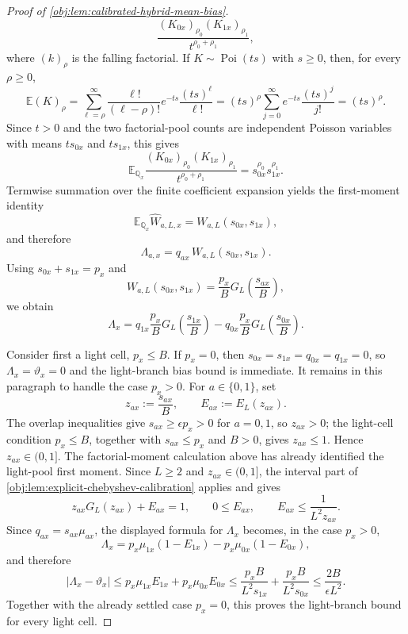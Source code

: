 \documentclass[11pt]{article}
\begin{document}
\begin{proof}[Proof of \cref{obj:lem:calibrated-hybrid-mean-bias}]
\[\frac{(K_{0x})_{\rho_0}(K_{1x})_{\rho_1}}
     {t^{\rho_0+\rho_1}},
\]
where \((k)_\rho\) is the falling factorial.  If \(K\sim\operatorname{Poi}(ts)\) with \(s\ge0\), then, for every \(\rho\ge0\),
\[
\mathbb E (K)_\rho
=
\sum_{\ell=\rho}^\infty
\frac{\ell!}{(\ell-\rho)!}
 e^{-ts}\frac{(ts)^\ell}{\ell!}
=(ts)^\rho
\sum_{j=0}^\infty e^{-ts}\frac{(ts)^j}{j!}
=(ts)^\rho.
\]
Since \(t>0\) and the two factorial-pool counts are independent Poisson variables with means \(t s_{0x}\) and \(t s_{1x}\), this gives
\[
\mathbb E_{\mathbb Q_x}
\frac{(K_{0x})_{\rho_0}(K_{1x})_{\rho_1}}
     {t^{\rho_0+\rho_1}}
=s_{0x}^{\rho_0}s_{1x}^{\rho_1}.
\]
Termwise summation over the finite coefficient expansion yields the first-moment identity
\[
\mathbb E_{\mathbb Q_x}\widehat W_{a,L,x}=W_{a,L}(s_{0x},s_{1x}),
\]
and therefore
\[
\Lambda_{a,x}
=q_{ax}\,W_{a,L}(s_{0x},s_{1x}).
\]
Using \(s_{0x}+s_{1x}=p_x\) and
\[
W_{a,L}(s_{0x},s_{1x})
=
\frac{p_x}{B}G_L\!\left(\frac{s_{ax}}B\right),
\]
we obtain
\[
\Lambda_x
=
q_{1x}\frac{p_x}{B}G_L\!\left(\frac{s_{1x}}B\right)
-
q_{0x}\frac{p_x}{B}G_L\!\left(\frac{s_{0x}}B\right).
\]

Consider first a light cell, \(p_x\le B\).  If \(p_x=0\), then \(s_{0x}=s_{1x}=q_{0x}=q_{1x}=0\), so \(\Lambda_x=\vartheta_x=0\) and the light-branch bias bound is immediate.  It remains in this paragraph to handle the case \(p_x>0\).  For \(a\in\{0,1\}\), set
\[
z_{ax}:=\frac{s_{ax}}B,
\qquad
E_{ax}:=E_L(z_{ax}).
\]
The overlap inequalities give \(s_{ax}\ge\epsilon p_x>0\) for \(a=0,1\), so \(z_{ax}>0\); the light-cell condition \(p_x\le B\), together with \(s_{ax}\le p_x\) and \(B>0\), gives \(z_{ax}\le1\).  Hence \(z_{ax}\in(0,1]\).  The factorial-moment calculation above has already identified the light-pool first moment.  Since \(L\ge2\) and \(z_{ax}\in(0,1]\), the interval part of \cref{obj:lem:explicit-chebyshev-calibration} applies and gives
\[
z_{ax}G_L(z_{ax})+E_{ax}=1,
\qquad
0\le E_{ax},
\qquad
E_{ax}\le\frac{1}{L^2z_{ax}} .
\]  Since
\(q_{ax}=s_{ax}\mu_{ax}\), the displayed formula for \(\Lambda_x\) becomes, in the case \(p_x>0\),
\[
\Lambda_x
=
p_x\mu_{1x}(1-E_{1x})
-
p_x\mu_{0x}(1-E_{0x}),
\]
and therefore
\[
|\Lambda_x-\vartheta_x|
\le
p_x\mu_{1x}E_{1x}+p_x\mu_{0x}E_{0x}
\le
\frac{p_xB}{L^2s_{1x}}+\frac{p_xB}{L^2s_{0x}}
\le
\frac{2B}{\epsilon L^2}.
\]
Together with the already settled case \(p_x=0\), this proves the light-branch bound for every light cell. %


\end{proof}
\end{document}
